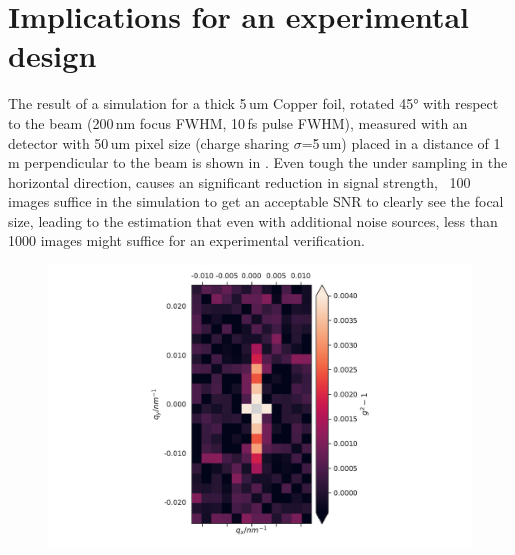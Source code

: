 \section{Implications for an experimental design}

The result of a simulation for a thick 5\,um Copper foil, rotated 45° with respect to the beam (200\,nm focus FWHM, 10\,fs pulse FWHM), measured with an detector with 50\,um pixel size (charge sharing $\sigma$=5\,um) placed in a distance of 1\,m  perpendicular to the beam is shown in . Even tough the under sampling in the horizontal direction, causes an significant reduction in signal strength, ~100 images suffice in the simulation to get an acceptable SNR to clearly see the  focal size, leading to the estimation that even with additional noise sources, less than 1000 images might suffice for an experimental verification.

\begin{figure}
	\centering
	\includegraphics[width=0.5\linewidth]{images/sim_foil5umCu_shared.pdf}
	\label{fig:simfoil}
\end{figure}